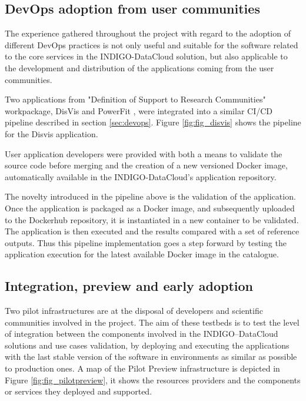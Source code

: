 \documentclass[journal]{IEEEtran}
\begin{document}
\subsection{DevOps adoption from user communities}

The experience gathered throughout the project with regard to the adoption of
different DevOps practices is not only useful and suitable for the software related
to the core services in the INDIGO-DataCloud solution, but also applicable to the
development and distribution of the applications coming from the user communities.

Two applications from "Definition of Support to Research Communities" workpackage, 
DisVis \cite{disvis} and PowerFit \cite{powerfit}, were
integrated into a similar CI/CD pipeline described in section \ref{sec:devops}.
Figure \ref{fig:fig_disvis} shows the pipeline for the Disvis application.

User application developers were provided with both a means to validate the
source code before merging and the creation of a new versioned Docker image,
automatically available in the INDIGO-DataCloud’s application repository.

The novelty introduced in the pipeline above is the validation of the application.
Once the application is packaged as a Docker image, and subsequently uploaded
to the Dockerhub repository, it is instantiated in a new container to be validated.
The application is then executed and the results compared with a set of reference outputs.
Thus this pipeline implementation goes a step forward by testing the application
execution for the latest available Docker image in the catalogue.

\subsection{Integration, preview and early adoption}

Two pilot infrastructures are at the disposal of developers and scientific
communities involved in the project. The aim of these testbeds is to test the
level of integration between the components involved in the INDIGO--DataCloud
solutions and use cases validation, by deploying and executing the applications
with the last stable version of the software in environments as similar as 
possible to production ones. A map of the Pilot Preview
infrastructure is depicted in Figure \ref{fig:fig_pilotpreview}, it shows the
resources providers and the components or services they deployed and supported.
\end{document}
